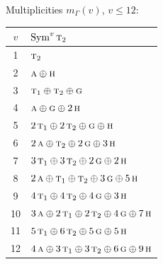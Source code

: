 \documentclass[11pt]{article}
\newcommand{\irr}[1]{\text{\normalfont\scshape #1}}
\begin{document}
Multiplicities $m_\Gamma(v)$, $v\le12$:
\begin{longtable}{c l}\hline $v$ & $\operatorname{Sym}^{v}\irr{t}_{2}$\\ \hline\endhead
1 & $\irr{t}_{2}$\\
2 & $\irr{a}\oplus \irr{h}$\\
3 & $\irr{t}_{1}\oplus \irr{t}_{2}\oplus \irr{g}$\\
4 & $\irr{a}\oplus \irr{g}\oplus 2\,\irr{h}$\\
5 & $2\,\irr{t}_{1}\oplus 2\,\irr{t}_{2}\oplus \irr{g}\oplus \irr{h}$\\
6 & $2\,\irr{a}\oplus \irr{t}_{2}\oplus 2\,\irr{g}\oplus 3\,\irr{h}$\\
7 & $3\,\irr{t}_{1}\oplus 3\,\irr{t}_{2}\oplus 2\,\irr{g}\oplus 2\,\irr{h}$\\
8 & $2\,\irr{a}\oplus \irr{t}_{1}\oplus \irr{t}_{2}\oplus 3\,\irr{g}\oplus 5\,\irr{h}$\\
9 & $4\,\irr{t}_{1}\oplus 4\,\irr{t}_{2}\oplus 4\,\irr{g}\oplus 3\,\irr{h}$\\
10 & $3\,\irr{a}\oplus 2\,\irr{t}_{1}\oplus 2\,\irr{t}_{2}\oplus 4\,\irr{g}\oplus 7\,\irr{h}$\\
11 & $5\,\irr{t}_{1}\oplus 6\,\irr{t}_{2}\oplus 5\,\irr{g}\oplus 5\,\irr{h}$\\
12 & $4\,\irr{a}\oplus 3\,\irr{t}_{1}\oplus 3\,\irr{t}_{2}\oplus 6\,\irr{g}\oplus 9\,\irr{h}$\\
\hline\end{longtable}
\end{document}
